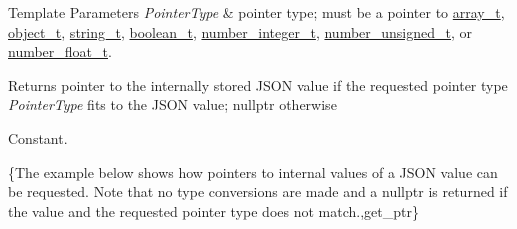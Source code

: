 \begin{DoxyTemplParams}{Template Parameters}
{\em Pointer\-Type} & pointer type; must be a pointer to \hyperlink{classnlohmann_1_1basic__json_ab00b882d39306d663c23dab110f5cae0}{array\-\_\-t}, \hyperlink{classnlohmann_1_1basic__json_a0ac9894c9de8dc551cf2e5f1c605537f}{object\-\_\-t}, \hyperlink{classnlohmann_1_1basic__json_ab63e618bbb0371042b1bec17f5891f42}{string\-\_\-t}, \hyperlink{classnlohmann_1_1basic__json_af3bc3e83aa162d7ba4df16a949872723}{boolean\-\_\-t}, \hyperlink{classnlohmann_1_1basic__json_ac4b10b2364f26ce47bdb9a413ff04a59}{number\-\_\-integer\-\_\-t}, \hyperlink{classnlohmann_1_1basic__json_a60a04166c122072ab11eaf9845d9cd1d}{number\-\_\-unsigned\-\_\-t}, or \hyperlink{classnlohmann_1_1basic__json_a74a0013e847fdc574b48f931f0e757e1}{number\-\_\-float\-\_\-t}.\\
\hline
\end{DoxyTemplParams}
\begin{DoxyReturn}{Returns}
pointer to the internally stored J\-S\-O\-N value if the requested pointer type {\itshape Pointer\-Type} fits to the J\-S\-O\-N value; {\ttfamily nullptr} otherwise
\end{DoxyReturn}
Constant.

\{The example below shows how pointers to internal values of a J\-S\-O\-N value can be requested. Note that no type conversions are made and a {\ttfamily nullptr} is returned if the value and the requested pointer type does not match.,get\-\_\-ptr\}

